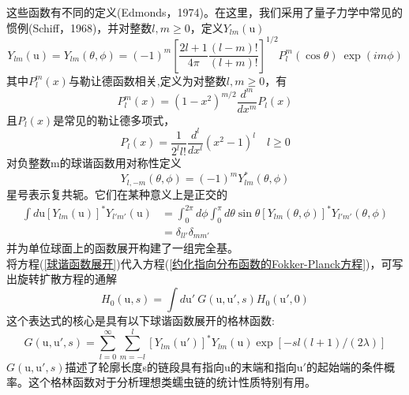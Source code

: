 这些函数有不同的定义(Edmonds，1974)。在这里，我们采用了量子力学中常见的惯例(Schiff，1968)，并对整数$l,m\geq 0$，定义$Y_{lm}(\mathrm{u})$\\
\begin{equation}
Y_{lm}(\mathrm{u}) = Y_{lm}(\theta,\phi)=(-1)^m\left[\frac{2l+1}{4\pi}\frac{(l-m)!}{(l+m)!}\right]^{1/2}P_l^m(\cos \theta )\ \exp(im\phi)
\end{equation}
其中$P_l^m(x)$与勒让德函数相关,定义为对整数$l,m\geq 0$，有\\
\begin{equation}
P_l^m(x)=(1-x^2)^{m/2}\frac{d^m}{dx^m}P_l(x)
\end{equation}
且$P_l(x)$是常见的勒让德多项式，\\
\begin{equation}
P_l(x)=\frac{1}{2^ll!}\frac{d^l}{dx^l}(x^2-1)^l\quad l\geq 0
\end{equation}
对负整数m的球谐函数用对称性定义\\
\begin{equation}
Y_{l,-m}(\theta,\phi) =(-1)^m Y_{lm}^*(\theta,\phi)
\end{equation}
星号表示复共轭。它们在某种意义上是正交的\\
\begin{equation}
\begin{aligned}
\int d\mathrm{u} \left[Y_{lm}(\mathrm{u})\right]^*Y_{l'm'}(\mathrm{u})&=\int_{0}^{2\pi}d\phi\int_{0}^{\pi}d\theta\sin\theta\left[Y_{lm}(\theta,\phi)\right]^*Y_{l'm'}(\theta,\phi)\\&=\delta_{ll'}\delta_{mm'}
\end{aligned}
\end{equation}
并为单位球面上的函数展开构建了一组完全基。\\

将方程(\ref{球谐函数展开})代入方程(\ref{约化指向分布函数的Fokker-Planck方程})，可写出旋转扩散方程的通解
\begin{equation}
H_0(\mathrm{u},s)=\int d\mathrm{u}'\ G(\mathrm{u},\mathrm{u}',s)H_0(\mathrm{u}',0)
\end{equation}
这个表达式的核心是具有以下球谐函数展开的格林函数:\\
\begin{equation}
G(\mathrm{u},\mathrm{u}',s) = \sum_{l=0}^{\infty}\sum_{m=-l}^{l}\left[Y_{lm}(\mathrm{u}')\right]^*Y_{lm}(\mathrm{u})\exp[-sl(l+1)/(2\lambda)]
\end{equation}
$G(\mathrm{u},\mathrm{u}',s)$描述了轮廓长度s的链段具有指向$\mathrm{u}$的末端和指向$\mathrm{u}'$的起始端的条件概率。这个格林函数对于分析理想类蠕虫链的统计性质特别有用。

